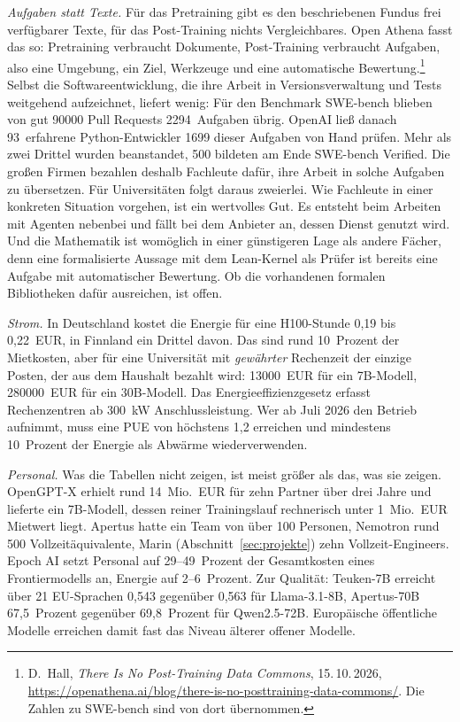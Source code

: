 \documentclass[a4paper,11pt]{article}
\begin{document}
\emph{Aufgaben statt Texte.} Für das Pretraining gibt es den
beschriebenen Fundus frei verfügbarer Texte, für das Post-Training
nichts Vergleichbares.  Open Athena fasst das so: Pretraining
verbraucht Dokumente, Post-Training verbraucht Aufgaben, also eine
Umgebung, ein Ziel, Werkzeuge und eine automatische
Bewertung.\footnote{D.~Hall, \emph{There Is No Post-Training Data
  Commons}, 15.\,10.\,2026,
  \url{https://openathena.ai/blog/there-is-no-posttraining-data-commons/}.
  Die Zahlen zu SWE-bench sind von dort übernommen.}  Selbst die
Softwareentwicklung, die ihre Arbeit in Versionsverwaltung und Tests
weitgehend aufzeichnet, liefert wenig: Für den Benchmark SWE-bench
blieben von gut \num{90000} Pull Requests \num{2294}~Aufgaben übrig.
OpenAI ließ danach 93~erfahrene Python-Entwickler \num{1699} dieser
Aufgaben von Hand prüfen.  Mehr als zwei Drittel wurden beanstandet,
500 bildeten am Ende SWE-bench Verified.  Die großen Firmen bezahlen
deshalb Fachleute dafür, ihre Arbeit in solche Aufgaben zu
übersetzen.  Für Universitäten folgt daraus zweierlei.  Wie Fachleute
in einer konkreten Situation vorgehen, ist ein wertvolles Gut.  Es
entsteht beim Arbeiten mit Agenten nebenbei und fällt bei dem
Anbieter an, dessen Dienst genutzt wird.  Und die Mathematik ist
womöglich in einer günstigeren Lage als andere Fächer, denn eine
formalisierte Aussage mit dem Lean-Kernel als Prüfer ist bereits eine
Aufgabe mit automatischer Bewertung.  Ob die vorhandenen formalen
Bibliotheken dafür ausreichen, ist offen.

\emph{Strom.} In Deutschland kostet die Energie für eine H100-Stunde
0,19 bis 0,22~EUR, in Finnland ein Drittel davon. Das sind rund
10~Prozent der Mietkosten, aber für eine Universität mit
\emph{gewährter} Rechenzeit der einzige Posten, der aus dem Haushalt
bezahlt wird: \num{13000}~EUR für ein 7B-Modell, \num{280000}~EUR für
ein 30B-Modell. Das Energieeffizienzgesetz erfasst Rechenzentren ab
300~kW Anschlussleistung.  Wer ab Juli 2026 den Betrieb aufnimmt, muss
eine PUE von höchstens 1,2 erreichen und mindestens 10~Prozent der
Energie als Abwärme wiederverwenden.

\emph{Personal.} Was die Tabellen nicht zeigen, ist meist größer als
das, was sie zeigen. OpenGPT-X erhielt rund 14~Mio.\ EUR für zehn
Partner über drei Jahre und lieferte ein 7B-Modell, dessen reiner
Trainingslauf rechnerisch unter 1~Mio.\ EUR Mietwert liegt. Apertus
hatte ein Team von über 100 Personen, Nemotron rund 500
Vollzeitäquivalente, Marin (Abschnitt~\ref{sec:projekte}) zehn
Vollzeit-Engineers. Epoch AI setzt Personal auf 29--49~Prozent der
Gesamtkosten eines Frontiermodells an, Energie auf 2--6~Prozent.
Zur Qualität: Teuken-7B erreicht über 21 EU-Sprachen 0,543 gegenüber
0,563 für Llama-3.1-8B, Apertus-70B 67,5~Prozent gegenüber 69,8~Prozent
für Qwen2.5-72B. Europäische öffentliche Modelle erreichen damit fast
das Niveau älterer offener Modelle.
\end{document}
